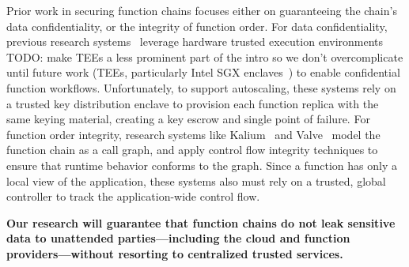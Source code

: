 %
Prior work in securing function chains focuses either on guaranteeing the
chain's data confidentiality, or the integrity of function order.
%
For data confidentiality, previous research systems~\cite{16-osdi-ryoan,
    19-ccsw-s_faas,
    19-systor-clemmys,
    19-systor-trust_more_serverless,
    21-isca-confidential_serverless,
    23-sec-confidential_serverless,
    23-socc-cryonics}
leverage hardware trusted execution environments
\color{red}TODO: make TEEs a less prominent part of the intro so we don't overcomplicate until future work\color{black}
(TEEs, particularly Intel SGX enclaves~\cite{
    13-hasp-innovative_instructions,
    16-techreport-intel_sgx_explained})
to enable confidential function workflows.
%
Unfortunately, to support autoscaling, these systems rely on a trusted
key distribution enclave to provision each function replica with the same
keying material, creating a key escrow and single point of failure.
%
For function order integrity, research systems like Kalium~\cite{23-sec-kalium}
and Valve~\cite{20-www-valve} model the function chain as a call graph, and
apply control flow integrity techniques to ensure that runtime behavior
conforms to the graph.
%
Since a function has only a local view of the application, these systems also
must rely on a trusted, global controller to track the application-wide control
flow.


%

\begin{tcolorbox}[boxsep=1pt]
\textbf{
    Our research will guarantee that function chains do not leak sensitive data
    to unattended parties---including the cloud and function
    providers---without resorting to centralized trusted services.
}
\end{tcolorbox}

